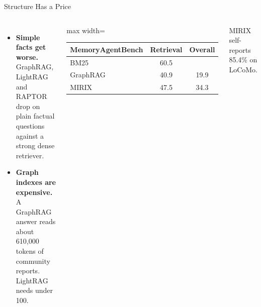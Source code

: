 \begin{frame}{Structure Has a Price}
    \begin{columns}[T,onlytextwidth]
        \begin{itemize}\itemsep0.45em
            \item \textbf{Simple facts get worse.} GraphRAG, LightRAG and RAPTOR drop on plain factual questions against a strong dense retriever.
            \item \textbf{Graph indexes are expensive.} A GraphRAG answer reads about 610,000 tokens of community reports. LightRAG needs under 100.
        \end{itemize}
        \centering
        \small
        \renewcommand{\arraystretch}{1.2}
        \begin{adjustbox}{max width=\linewidth}\begin{tabular}{lcc}
            \toprule
            \textbf{MemoryAgentBench} & \textbf{Retrieval} & \textbf{Overall} \\
            \midrule
            BM25 & 60.5 & \\
            GraphRAG & 40.9 & 19.9 \\
            MIRIX & 47.5 & 34.3 \\
            \bottomrule
        \end{tabular}\end{adjustbox}

        \vspace{0.5em}
        {\footnotesize MIRIX self-reports 85.4\% on LoCoMo.}
    \end{columns}
    \vspace{0.3em}
\end{frame}

